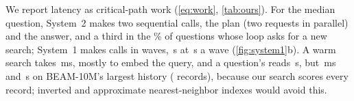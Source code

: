 We report latency as critical-path work (\cref{eq:work}, \cref{tab:ours}).
For the median question, System~2 makes two sequential calls, the plan (two requests in parallel) and the answer, and a third in the \workReplan\% of questions whose loop asks for a new search; System~1 makes \workJevCalls{} calls in \workJevWaves{} waves, \workJevTime\,s at \workWave\,s a wave (\cref{fig:system1}b).
A warm search takes \workSearchSmall\,ms, mostly to embed the query, and a question's reads \workReadSmall\,s, but \workSearchTen\,ms and \workReadTen\,s on BEAM-10M's largest history (\workTenRecords{} records), because our search scores every record; inverted and approximate nearest-neighbor indexes would avoid this.
